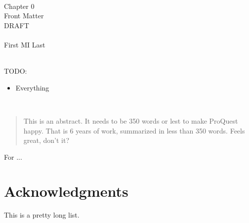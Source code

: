\documentclass[draftthesis,fullpage,offcenter]{uiucthesis2009}
\begin{document}
		
	\frontmatter
	
	\begin{center}
	~\\~\\~\\
		{\Large Chapter 0\\}
		{\LARGE Front Matter\\}
		{\Huge DRAFT\\}~\\
		{\Large First MI Last\\}
	\end{center}
	~\\
	{\Large TODO:}
	\begin{itemize}
		\item Everything
	\end{itemize}

	\newpage
	~\newpage
\else
\fi
	
\graphicspath{{./fig_ch0/}}


\begin{abstract}

This is an abstract.  It needs to be 350 words or lest to make ProQuest happy. 
That is 6 years of work, summarized in less than 350 words.  Feels great, don't 
it?

\end{abstract}

\begin{dedication}

For ...

\end{dedication}

\chapter*{Acknowledgments}

This is a pretty long list.

\end{document}
